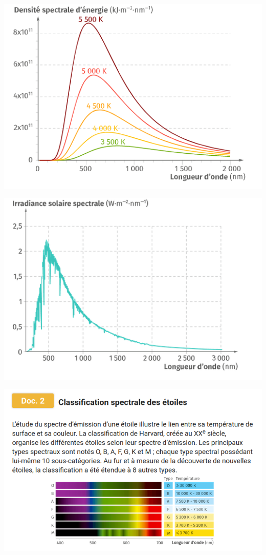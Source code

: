 \documentclass[10pt]{article}
\begin{document}
\begin{minipage}[t]{0.45\textwidth}
	\centering
	\includegraphics[scale=0.45]{doc1/1.png}
\end{minipage}
\hspace{0.1\textwidth}
\begin{minipage}[t]{0.45\textwidth}
	\centering
	\includegraphics[scale=0.45]{doc1/2.png}
\end{minipage}

\begin{center}
	\includegraphics[scale=0.45]{doc2.png}

\end{center}
\end{document}
